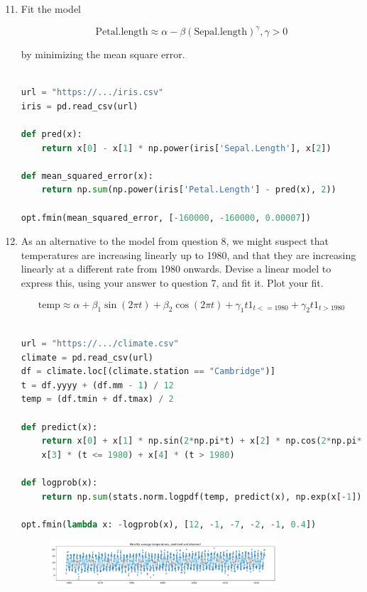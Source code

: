 \documentclass[10pt,\jkfside,a4paper]{article}
\begin{document}
\begin{enumerate}[label=\arabic*]

\setcounter{enumi}{10}

\item Fit the model

\[
\text{Petal.length} \approx \alpha - \beta(\text{Sepal.length})^{\gamma},
\gamma > 0
\]

by minimizing the mean square error.

\begin{lstlisting}[language=Python]

url = "https://.../iris.csv"
iris = pd.read_csv(url)

def pred(x):
	return x[0] - x[1] * np.power(iris['Sepal.Length'], x[2])

def mean_squared_error(x):
	return np.sum(np.power(iris['Petal.Length'] - pred(x), 2))

opt.fmin(mean_squared_error, [-160000, -160000, 0.00007])

\end{lstlisting}

\item As an alternative to the model from question 8, we might suspect that
temperatures are increasing linearly up to 1980, and that they are
increasing linearly at a different rate from 1980 onwards. Devise a linear
model to express this, using your answer to question 7, and fit it. Plot
your fit.

\[
\text{temp} \approx \alpha + \beta_1\sin(2\pi t) + \beta_2\cos(2\pi t) +
\gamma_1 t 1_{t<=1980} + \gamma_2 t 1_{t > 1980}
\]

\begin{lstlisting}[language=Python]

url = "https://.../climate.csv"
climate = pd.read_csv(url)
df = climate.loc[(climate.station == "Cambridge")]
t = df.yyyy + (df.mm - 1) / 12
temp = (df.tmin + df.tmax) / 2

def predict(x):
	return x[0] + x[1] * np.sin(2*np.pi*t) + x[2] * np.cos(2*np.pi*t) + \
	x[3] * (t <= 1980) + x[4] * (t > 1980)

def logprob(x):
	return np.sum(stats.norm.logpdf(temp, predict(x), np.exp(x[-1])))

opt.fmin(lambda x: -logprob(x), [12, -1, -7, -2, -1, 0.4])

\end{lstlisting}

\begin{figure}[H]
    \centering
    \includegraphics[width=0.8\textwidth]{q12_img}
\end{figure}


\end{enumerate}
\end{document}
